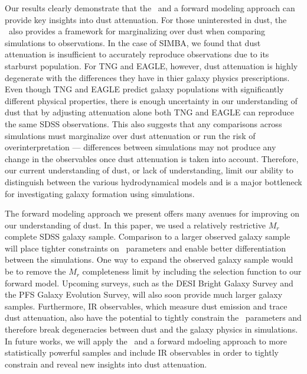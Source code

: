 Our results clearly demonstrate that the \eda~and a forward modeling approach
can provide key insights into dust attenuation. For those uninterested in dust,
the \eda~also provides a framework for marginalizing over dust when comparing
simulations to observations. In the case of SIMBA, we found that dust
attenuation is insufficient to accurately reproduce observations due to its 
starburst population. For TNG and EAGLE, however, dust attenuation is highly
degenerate with the differences they have in thier galaxy physics
prescriptions. Even though TNG and EAGLE predict galaxy populations with
significantly different physical properties, there is enough uncertainty in our
understanding of dust that by adjusting attenuation alone both TNG and EAGLE
can reproduce the same SDSS observations. This also suggests that any
comparisons across simulations must marginalize over dust attenuation or run 
the risk of overinterpretation --- differences between simulations may not
produce any change in the observables once dust attenuation is taken into account. 
Therefore, our current understanding of dust, or lack of understanding, limit
our ability to distinguish between the various hydrodynamical models and is a
major bottleneck for investigating galaxy formation using simulations.

The forward modeling approach we present offers many avenues for improving on
our understanding of dust. In this paper, we used a relatively restrictive 
$M_r$ complete SDSS galaxy sample. Comparison to a larger observed galaxy
sample will place tighter constraints on \eda~parameters and enable better
differentiation between the simulations. One way to expand the observed galaxy
sample would be to remove the $M_r$ completeness limit by including the
selection function to our forward model. Upcoming surveys, such as the DESI
Bright Galaxy Survey and the PFS Galaxy Evolution Survey, will also soon
provide much larger galaxy samples. Furthermore, IR observables, which measure
dust emission and trace dust attenuation, also have the potential to tightly 
constrain the \eda~parameters and therefore break degeneracies between dust
and the galaxy physics in simulations. In future works, we will apply the
\eda~and a forward mdoeling approach to more statistically powerful samples and
include IR observables in order to tightly constrain and reveal new insights 
into dust attenuation. 
